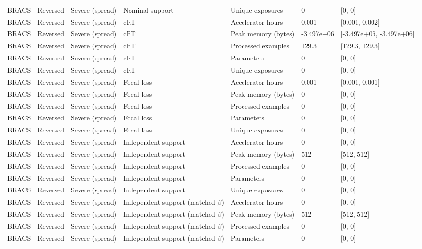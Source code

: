 \begin{longtable}{lllllll}
BRACS & Reversed & Severe (spread) & Nominal support & Unique exposures & 0 & [0, 0] \\
BRACS & Reversed & Severe (spread) & cRT & Accelerator hours & 0.001 & [0.001, 0.002] \\
BRACS & Reversed & Severe (spread) & cRT & Peak memory (bytes) & -3.497e+06 & [-3.497e+06, -3.497e+06] \\
BRACS & Reversed & Severe (spread) & cRT & Processed examples & 129.3 & [129.3, 129.3] \\
BRACS & Reversed & Severe (spread) & cRT & Parameters & 0 & [0, 0] \\
BRACS & Reversed & Severe (spread) & cRT & Unique exposures & 0 & [0, 0] \\
BRACS & Reversed & Severe (spread) & Focal loss & Accelerator hours & 0.001 & [0.001, 0.001] \\
BRACS & Reversed & Severe (spread) & Focal loss & Peak memory (bytes) & 0 & [0, 0] \\
BRACS & Reversed & Severe (spread) & Focal loss & Processed examples & 0 & [0, 0] \\
BRACS & Reversed & Severe (spread) & Focal loss & Parameters & 0 & [0, 0] \\
BRACS & Reversed & Severe (spread) & Focal loss & Unique exposures & 0 & [0, 0] \\
BRACS & Reversed & Severe (spread) & Independent support & Accelerator hours & 0 & [0, 0] \\
BRACS & Reversed & Severe (spread) & Independent support & Peak memory (bytes) & 512 & [512, 512] \\
BRACS & Reversed & Severe (spread) & Independent support & Processed examples & 0 & [0, 0] \\
BRACS & Reversed & Severe (spread) & Independent support & Parameters & 0 & [0, 0] \\
BRACS & Reversed & Severe (spread) & Independent support & Unique exposures & 0 & [0, 0] \\
BRACS & Reversed & Severe (spread) & Independent support (matched $\beta$) & Accelerator hours & 0 & [0, 0] \\
BRACS & Reversed & Severe (spread) & Independent support (matched $\beta$) & Peak memory (bytes) & 512 & [512, 512] \\
BRACS & Reversed & Severe (spread) & Independent support (matched $\beta$) & Processed examples & 0 & [0, 0] \\
BRACS & Reversed & Severe (spread) & Independent support (matched $\beta$) & Parameters & 0 & [0, 0] \\

\end{longtable}
